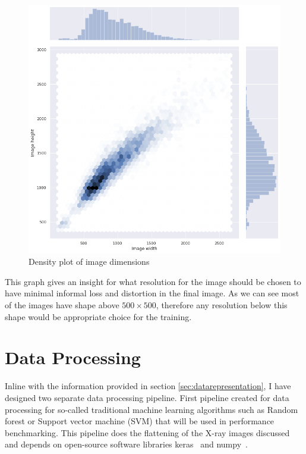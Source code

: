\begin{figure}[H]
    \centering
    \includegraphics[width=\textwidth]{img/image_dims_density.png}
    \caption{Density plot of image dimensions}
    \label{fig:imagedimensions}
\end{figure}

This graph gives an insight for what resolution for the image should be chosen to have minimal informal loss and distortion in the final image. As we can see most of the images have shape above $500 \times 500$, therefore any resolution below this shape would be appropriate choice for the training. 

\section{Data Processing} \label{sec:dataprocessing}
Inline with the information provided in section \ref{sec:datarepresentation}, I have designed two separate data processing pipeline.
First pipeline created for data processing for so-called traditional machine learning algorithms such as Random forest or Support vector machine (SVM) that will be used in performance benchmarking.
This pipeline does the flattening of the X-ray images discussed and depends on open-source software libraries keras~\cite{keras} and numpy~\cite{numpy}.


